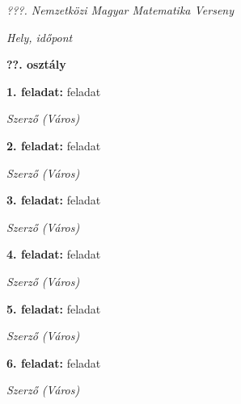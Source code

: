\documentclass[a4paper,10pt]{article}
\newcommand{\ki}[2]{\hfill {\it #1 (#2)}\medskip}
\begin{document}
\begin{center} \Large {\em ???. Nemzetközi Magyar Matematika Verseny} \end{center}
\begin{center} \large{\em Hely, időpont} \end{center}
\smallskip
\begin{center} \large{\bf ??. osztály} \end{center}
\bigskip 

{\bf 1. feladat: } feladat

\ki{Szerző}{Város}\medskip

{\bf 2. feladat: } feladat

\ki{Szerző}{Város}\medskip

{\bf 3. feladat: } feladat

\ki{Szerző}{Város}\medskip

{\bf 4. feladat: } feladat

\ki{Szerző}{Város}\medskip

{\bf 5. feladat: } feladat

\ki{Szerző}{Város}\medskip

{\bf 6. feladat: } feladat

\ki{Szerző}{Város}\medskip
\end{document}
